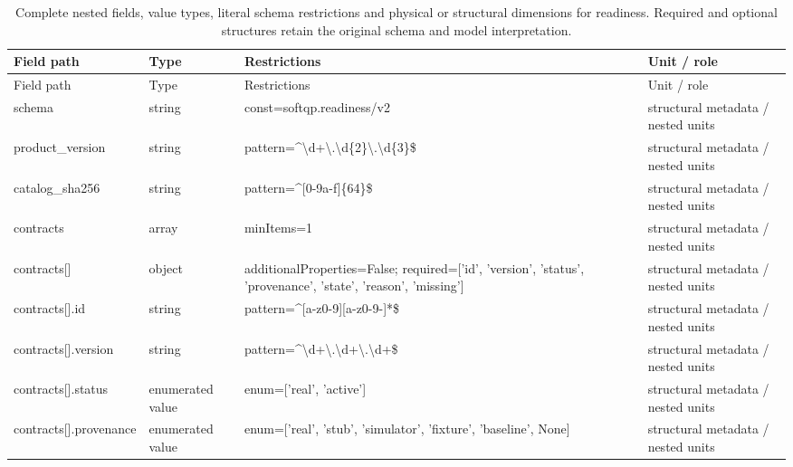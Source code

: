 \begingroup\footnotesize\setlength{\tabcolsep}{3pt}
\begin{longtable}{@{}>{\raggedright\arraybackslash}p{}>{\raggedright\arraybackslash}p{}>{\raggedright\arraybackslash}p{}>{\raggedright\arraybackslash}p{}@{}}
\caption{Complete nested fields, value types, literal schema restrictions and physical or structural dimensions for readiness. Required and optional structures retain the original schema and model interpretation.}\label{tab:nested-readiness}\\
\toprule Field path & Type & Restrictions & Unit / role\\\midrule\endfirsthead
\toprule Field path & Type & Restrictions & Unit / role\\\midrule\endhead
\bottomrule\endfoot
schema & string & const=\allowbreak{}softqp.\allowbreak{}readiness/\allowbreak{}v2 & structural metadata /\allowbreak{} nested units\\
product\_\allowbreak{}version & string & pattern=\allowbreak{}\textasciicircum{}\textbackslash{}d+\textbackslash{}.\allowbreak{}\textbackslash{}d\{2\}\textbackslash{}.\allowbreak{}\textbackslash{}d\{3\}\$ & structural metadata /\allowbreak{} nested units\\
catalog\_\allowbreak{}sha256 & string & pattern=\allowbreak{}\textasciicircum{}[0-9a-\allowbreak{}f]\{64\}\$ & structural metadata /\allowbreak{} nested units\\
contracts & array & minItems=\allowbreak{}1 & structural metadata /\allowbreak{} nested units\\
contracts[] & object & additionalProperties=\allowbreak{}False; required=\allowbreak{}['id', 'version', 'status', 'provenance', 'state', 'reason', 'missing'] & structural metadata /\allowbreak{} nested units\\
contracts[].\allowbreak{}id & string & pattern=\allowbreak{}\textasciicircum{}[a-\allowbreak{}z0-9][a-\allowbreak{}z0-9-]*\$ & structural metadata /\allowbreak{} nested units\\
contracts[].\allowbreak{}version & string & pattern=\allowbreak{}\textasciicircum{}\textbackslash{}d+\textbackslash{}.\allowbreak{}\textbackslash{}d+\textbackslash{}.\allowbreak{}\textbackslash{}d+\$ & structural metadata /\allowbreak{} nested units\\
contracts[].\allowbreak{}status & enumerated value & enum=\allowbreak{}['real', 'active'] & structural metadata /\allowbreak{} nested units\\
contracts[].\allowbreak{}provenance & enumerated value & enum=\allowbreak{}['real', 'stub', 'simulator', 'fixture', 'baseline', None] & structural metadata /\allowbreak{} nested units\\

\end{longtable}
